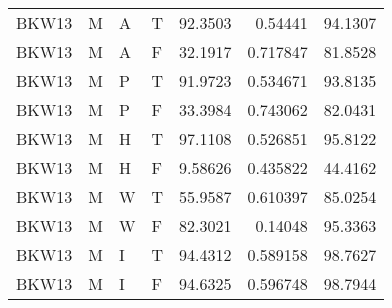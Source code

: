 \begin{tabular}{llllrrr}
    BKW13    & M     & A     & T          & 92.3503    & 0.54441   & 94.1307  \\
    BKW13    & M     & A     & F          & 32.1917    & 0.717847  & 81.8528  \\
    BKW13    & M     & P     & T          & 91.9723    & 0.534671  & 93.8135  \\
    BKW13    & M     & P     & F          & 33.3984    & 0.743062  & 82.0431  \\
    BKW13    & M     & H     & T          & 97.1108    & 0.526851  & 95.8122  \\
    BKW13    & M     & H     & F          & 9.58626    & 0.435822  & 44.4162  \\
    BKW13    & M     & W     & T          & 55.9587    & 0.610397  & 85.0254  \\
    BKW13    & M     & W     & F          & 82.3021    & 0.14048   & 95.3363  \\
    BKW13    & M     & I     & T          & 94.4312    & 0.589158  & 98.7627  \\
    BKW13    & M     & I     & F          & 94.6325    & 0.596748  & 98.7944  \\
    \hline
\end{tabular}